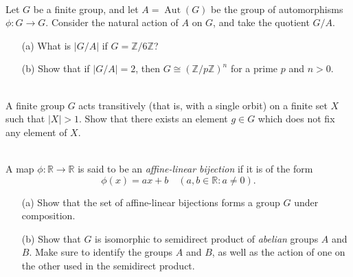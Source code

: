 \documentclass{article}
\def\zz{{\mathbb Z}}
\def\rr{{\mathbb R}}
\begin{document}
\begin{problem} \\
    Let $G$ be a finite group, and let $A = \operatorname{Aut}(G)$ be the group of automorphisms $\phi : G \to G$. Consider the natural action of $A$ on $G$, and take the quotient $G/A$.
    \begin{enumerate}
        \item[(a)] What is $|G/A|$ if $G = \zz/6\zz$? %
        \item[(b)] Show that if $|G/A| = 2$, then $G \cong (\zz/p\zz)^n$ for a prime $p$ and $n > 0$. %
    \end{enumerate}
\end{problem}




\begin{problem} \\
    A finite group $G$ acts transitively (that is, with a single orbit) on a finite set $X$ such that $|X| > 1$. Show that there exists an element $g \in G$ which does not fix any element of $X$.
\end{problem}



\begin{problem} \\
    A map $\phi : \rr \to \rr$ is said to be an \textit{affine-linear bijection} if it is of the form 
    \[
        \phi(x) = ax + b \quad (a,b \in \rr : a \neq 0).
    \]
    \begin{enumerate}
        \item[(a)] Show that the set of affine-linear bijections forms a group $G$ under composition. %
        \item[(b)] Show that $G$ is isomorphic to semidirect product of \textit{abelian} groups $A$ and $B$. Make sure to identify the groups $A$ and $B$, as well as the action of one on the other used in the semidirect product. %
    \end{enumerate}
\end{problem}
\end{document}

